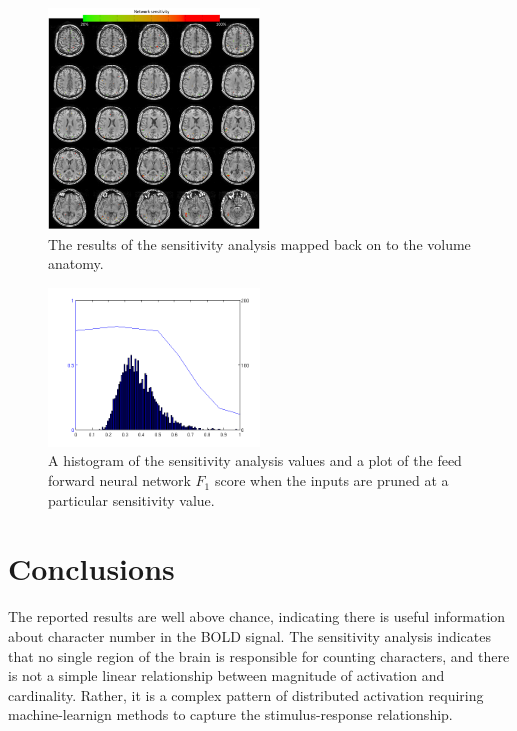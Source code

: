 \documentclass[twocolumn,final]{article}
\begin{document}
\begin{figure}[!htbp]
\centering
\includegraphics[width=0.5\textwidth]{figures/sensitivity-analysis}
\caption{The results of the sensitivity analysis mapped back on to the volume anatomy.}
\label{fig:sensitivity-analysis}
\end{figure}

\begin{figure}[!htbp]
\centering
\includegraphics[width=0.5\textwidth]{figures/sensitivity-cutoff}
\caption{A histogram of the sensitivity analysis values and a plot of the feed forward neural network $F_1$ score when the inputs are pruned at a particular sensitivity value. }
\label{fig:sensitivity-cutoff}
\end{figure}

\section{Conclusions}
The reported results are well above chance, indicating there is useful information about character number in the BOLD signal.
The sensitivity analysis indicates that no single region of the brain is responsible for counting characters, and there is not a simple linear relationship between magnitude of activation and cardinality.
Rather, it is a complex pattern of distributed activation requiring machine-learnign methods to capture the stimulus-response relationship.
\end{document}

